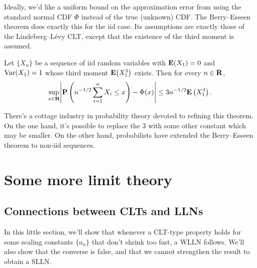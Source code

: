 \documentclass[11pt,letterpaper,reqno,oneside]{article}
\begin{document}
Ideally, we'd like a uniform bound on the approximation error from using the standard normal CDF $\Phi$ instead of the true (unknown) CDF. The Berry--Esseen theorem does exactly this for the iid case. Its assumptions are exactly those of the Lindeberg--Lévy CLT, except that the existence of the third moment is assumed.
%
\begin{theorem}
	Let $\{ X_n \}$ be a sequence of iid random variables with $\mathbf{E}(X_1)=0$ and $\mathrm{Var}(X_1)=1$ whose third moment $\mathbf{E}\bigl(X_1^3\bigr)$ exists. Then for every $n \in \mathbf{R}$,
	\begin{equation*}
		\sup_{x\in\R} \abs*{ \PP\left( n^{-1/2} \sum_{i=1}^n X_i \leq x \right) - \Phi(x) }
		\leq 3 n^{-1/2} \E\left( X_1^3 \right) .
	\end{equation*}
\end{theorem}
%
There's a cottage industry in probability theory devoted to refining this theorem. On the one hand, it's possible to replace the $3$ with some other constant which may be smaller. On the other hand, probabilists have extended the Berry--Esseen theorem to non-iid sequences. 



\section{Some more limit theory}
\label{sec:LIL}




\subsection{Connections between CLTs and LLNs}
\label{sec:LIL:connections_CLTs_LLNs}

In this little section, we'll show that whenever a CLT-type property holds for some scaling constants $\{ a_n \}$ that don't shrink too fast, a WLLN follows. We'll also show that the converse is false, and that we cannot strengthen the result to obtain a SLLN.
\end{document}
